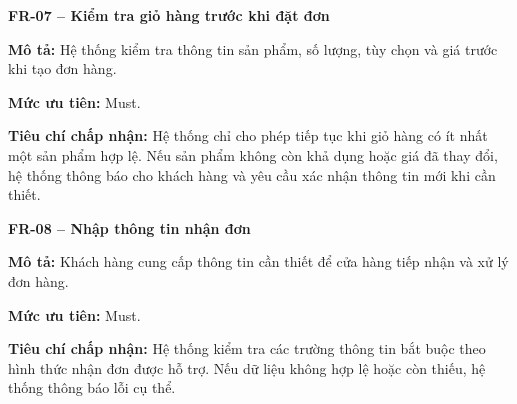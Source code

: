 \documentclass[a4paper]{article}
\begin{document}
\par\ifdim\dimexpr\pagegoal-\pagetotal\relax<6\baselineskip\newpage\fi
{}

\noindent\textbf{FR-07 – Kiểm tra giỏ hàng trước khi đặt đơn}\par\nopagebreak
\begin{list}{}{%
    \setlength{\leftmargin}{0.8cm}%
    \setlength{\rightmargin}{0pt}%
    \setlength{\labelwidth}{0pt}%
    \setlength{\labelsep}{0pt}%
    \setlength{\itemindent}{0pt}%
    \setlength{\listparindent}{0pt}%
    \setlength{\itemsep}{5pt}%
    \setlength{\parsep}{0pt}%
    \setlength{\topsep}{5pt}%
}
\item[] \textbf{Mô tả:} Hệ thống kiểm tra thông tin sản phẩm, số lượng, tùy chọn và giá trước khi tạo đơn hàng.
\item[] \textbf{Mức ưu tiên:} Must.
\item[] \textbf{Tiêu chí chấp nhận:} Hệ thống chỉ cho phép tiếp tục khi giỏ hàng có ít nhất một sản phẩm hợp lệ. Nếu sản phẩm không còn khả dụng hoặc giá đã thay đổi, hệ thống thông báo cho khách hàng và yêu cầu xác nhận thông tin mới khi cần thiết.
\end{list}

\par\ifdim\dimexpr\pagegoal-\pagetotal\relax<6\baselineskip\newpage\fi
{}

\noindent\textbf{FR-08 – Nhập thông tin nhận đơn}\par\nopagebreak
\begin{list}{}{%
    \setlength{\leftmargin}{0.8cm}%
    \setlength{\rightmargin}{0pt}%
    \setlength{\labelwidth}{0pt}%
    \setlength{\labelsep}{0pt}%
    \setlength{\itemindent}{0pt}%
    \setlength{\listparindent}{0pt}%
    \setlength{\itemsep}{5pt}%
    \setlength{\parsep}{0pt}%
    \setlength{\topsep}{5pt}%
}
\item[] \textbf{Mô tả:} Khách hàng cung cấp thông tin cần thiết để cửa hàng tiếp nhận và xử lý đơn hàng.
\item[] \textbf{Mức ưu tiên:} Must.
\item[] \textbf{Tiêu chí chấp nhận:} Hệ thống kiểm tra các trường thông tin bắt buộc theo hình thức nhận đơn được hỗ trợ. Nếu dữ liệu không hợp lệ hoặc còn thiếu, hệ thống thông báo lỗi cụ thể.
\end{list}

\par\ifdim\dimexpr\pagegoal-\pagetotal\relax<6\baselineskip\newpage\fi
{}
\end{document}
